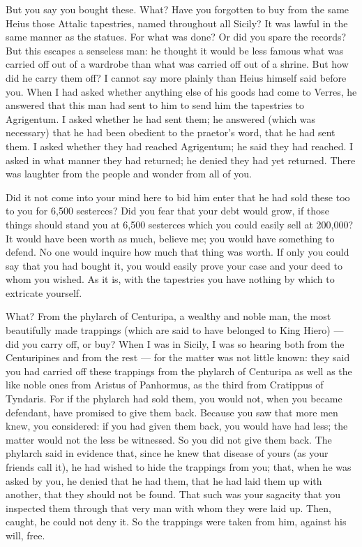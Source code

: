  But you say you bought these. What? Have you forgotten to buy from the same Heius those Attalic tapestries, named throughout all Sicily? It was lawful in the same manner as the statues. For what was done? Or did you spare the records? But this escapes a senseless man: he thought it would be less famous what was carried off out of a wardrobe than what was carried off out of a shrine. But how did he carry them off? I cannot say more plainly than Heius himself said before you. When I had asked whether anything else of his goods had come to Verres, he answered that this man had sent to him to send him the tapestries to Agrigentum. I asked whether he had sent them; he answered (which was necessary) that he had been obedient to the praetor's word, that he had sent them. I asked whether they had reached Agrigentum; he said they had reached. I asked in what manner they had returned; he denied they had yet returned. There was laughter from the people and wonder from all of you.

 Did it not come into your mind here to bid him enter that he had sold these too to you for 6,500 sesterces? Did you fear that your debt would grow, if those things should stand you at 6,500 sesterces which you could easily sell at 200,000? It would have been worth as much, believe me; you would have something to defend. No one would inquire how much that thing was worth. If only you could say that you had bought it, you would easily prove your case and your deed to whom you wished. As it is, with the tapestries you have nothing by which to extricate yourself.

 What? From the phylarch of Centuripa, a wealthy and noble man, the most beautifully made trappings (which are said to have belonged to King Hiero) --- did you carry off, or buy? When I was in Sicily, I was so hearing both from the Centuripines and from the rest --- for the matter was not little known: they said you had carried off these trappings from the phylarch of Centuripa as well as the like noble ones from Aristus of Panhormus, as the third from Cratippus of Tyndaris. For if the phylarch had sold them, you would not, when you became defendant, have promised to give them back. Because you saw that more men knew, you considered: if you had given them back, you would have had less; the matter would not the less be witnessed. So you did not give them back. The phylarch said in evidence that, since he knew that disease of yours (as your friends call it), he had wished to hide the trappings from you; that, when he was asked by you, he denied that he had them, that he had laid them up with another, that they should not be found. That such was your sagacity that you inspected them through that very man with whom they were laid up. Then, caught, he could not deny it. So the trappings were taken from him, against his will, free.

